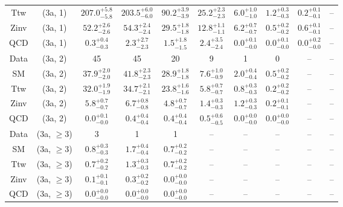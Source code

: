\begin{table}[h!]
{\begin{tabular}{cccccccccc}
	Ttw & (3a, 1) & $207.0^{+ 5.8 }_{- 5.8 }$ & $203.5^{+ 6.0 }_{- 6.0 }$ & $90.2^{+ 3.9 }_{- 3.9 }$ & $25.2^{+ 2.3 }_{- 2.3 }$ & $6.0^{+ 1.0 }_{- 1.0 }$ & $1.2^{+ 0.3 }_{- 0.3 }$ & $0.2^{+ 0.1 }_{- 0.1 }$ & -- \\[0.5ex] 
	Zinv & (3a, 1) & $52.2^{+ 2.6 }_{- 2.6 }$ & $54.3^{+ 2.4 }_{- 2.4 }$ & $29.5^{+ 1.8 }_{- 1.8 }$ & $12.8^{+ 1.1 }_{- 1.1 }$ & $6.2^{+ 0.7 }_{- 0.7 }$ & $0.5^{+ 0.2 }_{- 0.2 }$ & $0.6^{+ 0.1 }_{- 0.1 }$ & -- \\[0.5ex] 
	QCD & (3a, 1) & $0.3^{+ 0.4 }_{- 0.3 }$ & $2.3^{+ 2.7 }_{- 2.3 }$ & $1.5^{+ 1.8 }_{- 1.5 }$ & $2.4^{+ 3.5 }_{- 2.4 }$ & $0.0^{+ 0.1 }_{- 0.0 }$ & $0.0^{+ 0.1 }_{- 0.0 }$ & $0.0^{+ 0.2 }_{- 0.0 }$ & -- \\[0.5ex] 
	Data & (3a, 2) & 45 & 45 & 20 & 9 & 1 & 0 & -- & -- \\[0.5ex] 
	SM & (3a, 2) & $37.9^{+ 2.0 }_{- 2.0 }$ & $41.8^{+ 2.3 }_{- 2.3 }$ & $28.9^{+ 1.8 }_{- 1.8 }$ & $7.6^{+ 1.0 }_{- 0.9 }$ & $2.0^{+ 0.4 }_{- 0.4 }$ & $0.5^{+ 0.2 }_{- 0.2 }$ & -- & -- \\[0.5ex] 
	Ttw & (3a, 2) & $32.0^{+ 1.9 }_{- 1.9 }$ & $34.7^{+ 2.1 }_{- 2.1 }$ & $23.8^{+ 1.6 }_{- 1.6 }$ & $5.8^{+ 0.7 }_{- 0.7 }$ & $0.8^{+ 0.3 }_{- 0.3 }$ & $0.2^{+ 0.2 }_{- 0.2 }$ & -- & -- \\[0.5ex] 
	Zinv & (3a, 2) & $5.8^{+ 0.7 }_{- 0.7 }$ & $6.7^{+ 0.8 }_{- 0.8 }$ & $4.8^{+ 0.7 }_{- 0.7 }$ & $1.4^{+ 0.3 }_{- 0.3 }$ & $1.2^{+ 0.3 }_{- 0.3 }$ & $0.2^{+ 0.1 }_{- 0.1 }$ & -- & -- \\[0.5ex] 
	QCD & (3a, 2) & $0.0^{+ 0.1 }_{- 0.0 }$ & $0.4^{+ 0.4 }_{- 0.4 }$ & $0.4^{+ 0.4 }_{- 0.4 }$ & $0.5^{+ 0.6 }_{- 0.5 }$ & $0.0^{+ 0.0 }_{- 0.0 }$ & $0.0^{+ 0.0 }_{- 0.0 }$ & -- & -- \\[0.5ex] 
	Data & (3a, $\ge3$) & 3 & 1 & 1 & -- & -- & -- & -- & -- \\[0.5ex] 
	SM & (3a, $\ge3$) & $0.8^{+ 0.3 }_{- 0.3 }$ & $1.7^{+ 0.4 }_{- 0.4 }$ & $0.7^{+ 0.2 }_{- 0.2 }$ & -- & -- & -- & -- & -- \\[0.5ex] 
	Ttw & (3a, $\ge3$) & $0.7^{+ 0.2 }_{- 0.2 }$ & $1.3^{+ 0.3 }_{- 0.3 }$ & $0.7^{+ 0.2 }_{- 0.2 }$ & -- & -- & -- & -- & -- \\[0.5ex] 
	Zinv & (3a, $\ge3$) & $0.1^{+ 0.1 }_{- 0.1 }$ & $0.3^{+ 0.2 }_{- 0.2 }$ & $0.0^{+ 0.0 }_{- 0.0 }$ & -- & -- & -- & -- & -- \\[0.5ex] 
	QCD & (3a, $\ge3$) & $0.0^{+ 0.0 }_{- 0.0 }$ & $0.0^{+ 0.0 }_{- 0.0 }$ & $0.0^{+ 0.0 }_{- 0.0 }$ & -- & -- & -- & -- & -- \\[0.5ex] 

\end{tabular}}
\end{table}
